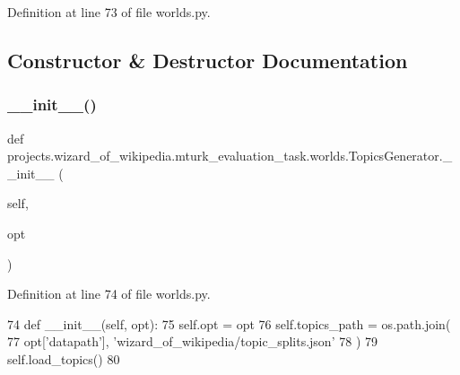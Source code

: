 Definition at line 73 of file worlds.\+py.



\subsection{Constructor \& Destructor Documentation}
\mbox{\label{classprojects_1_1wizard__of__wikipedia_1_1mturk__evaluation__task_1_1worlds_1_1TopicsGenerator_ab0591d0cf65c47ce1341247bd0c79d36}} 
\subsubsection{\texorpdfstring{\+\_\+\+\_\+init\+\_\+\+\_\+()}{\_\_init\_\_()}}
{\footnotesize\ttfamily def projects.\+wizard\+\_\+of\+\_\+wikipedia.\+mturk\+\_\+evaluation\+\_\+task.\+worlds.\+Topics\+Generator.\+\_\+\+\_\+init\+\_\+\+\_\+ (\begin{DoxyParamCaption}\item[{}]{self,  }\item[{}]{opt }\end{DoxyParamCaption})}



Definition at line 74 of file worlds.\+py.


\begin{DoxyCode}
74     \textcolor{keyword}{def }\_\_init\_\_(self, opt):
75         self.opt = opt
76         self.topics\_path = os.path.join(
77             opt[\textcolor{stringliteral}{'datapath'}], \textcolor{stringliteral}{'wizard\_of\_wikipedia/topic\_splits.json'}
78         )
79         self.load\_topics()
80 
\end{DoxyCode}


